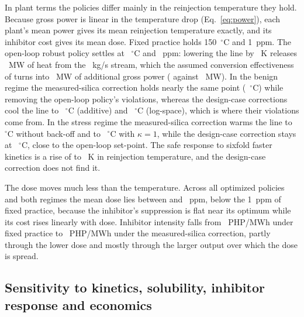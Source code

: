 In plant terms the policies differ mainly in the reinjection
temperature they hold. Because gross power is linear in the temperature
drop (Eq.~\eqref{eq:power}), each plant's mean power gives its mean
reinjection temperature exactly, and its inhibitor cost gives its mean
dose. Fixed practice holds 150~$^{\circ}$C and 1~ppm. The open-loop
robust policy settles at ~$^{\circ}$C and
~ppm: lowering the line by ~K releases
~MW of heat from the ~kg/s stream, which the
assumed conversion effectiveness of  turns into
~MW of additional gross power ( against
~MW). In the benign regime the measured-silica
correction holds nearly the same point (~$^{\circ}$C)
while removing the open-loop policy's violations, whereas the
design-case corrections cool the line to ~$^{\circ}$C
(additive) and ~$^{\circ}$C (log-space), which is where
their violations come from. In the stress regime the measured-silica
correction warms the line to ~$^{\circ}$C without
back-off and to ~$^{\circ}$C with $\kappa = 1$, while the
design-case correction stays at ~$^{\circ}$C, close to
the open-loop set-point. The safe response to sixfold faster kinetics
is a rise of  to ~K in reinjection
temperature, and the design-case correction does not find it.

The dose moves much less than the temperature. Across all optimized
policies and both regimes the mean dose lies between  and
~ppm, below the 1~ppm of fixed practice, because the
inhibitor's suppression is flat near its optimum while its cost rises
linearly with dose. Inhibitor intensity falls from
~PHP/MWh under fixed practice to ~PHP/MWh
under the measured-silica correction, partly through the lower dose and
mostly through the larger output over which the dose is spread.

\subsection{Sensitivity to kinetics, solubility, inhibitor response and
economics}\label{sec:sobol}

